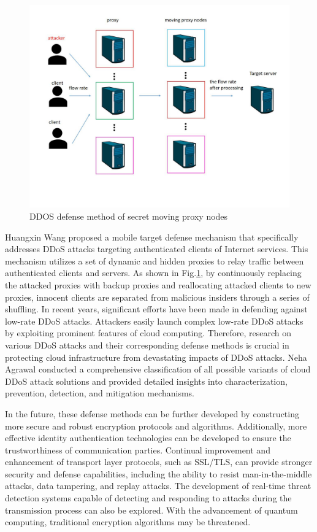 \documentclass[conference]{IEEEtran}
\begin{document}
\begin{figure}[htbp]
    \centerline{\includegraphics[width=0.8\linewidth,height=0.6\linewidth]{picture/de-ddos.jpg}}
    \caption{DDOS defense method of secret moving proxy nodes}
    \label{fig16}
\end{figure}
Huangxin Wang \cite{b131} proposed a mobile target defense mechanism that specifically addresses DDoS
attacks targeting authenticated clients of Internet services.
This mechanism utilizes a set of dynamic and hidden proxies to relay
traffic between authenticated clients and servers. As shown in Fig.\ref{fig16}, by continuously
replacing the attacked proxies with backup proxies and reallocating attacked clients to new proxies,
innocent clients are separated from malicious insiders through a series of shuffling.
In recent years, significant efforts have been made in defending against
low-rate DDoS attacks. Attackers easily launch complex low-rate
DDoS attacks by exploiting prominent features of cloud computing.
Therefore, research on various DDoS attacks and their corresponding defense
methods is crucial in protecting cloud infrastructure from devastating impacts
of DDoS attacks. Neha Agrawal \cite{b132} conducted a comprehensive classification
of all possible variants of cloud DDoS attack solutions and provided detailed insights
into characterization, prevention, detection, and mitigation mechanisms.


In the future, these defense methods can be further developed by constructing more secure and robust encryption protocols and algorithms.
Additionally, more effective identity authentication technologies can be developed to ensure the trustworthiness of communication parties.
Continual improvement and enhancement of transport layer protocols, such as SSL/TLS, can provide stronger security and defense capabilities,
including the ability to resist man-in-the-middle attacks, data tampering, and replay attacks.
The development of real-time threat detection systems capable of detecting and responding to attacks
during the transmission process can also be explored. With the advancement of quantum computing,
traditional encryption algorithms may be threatened.
\end{document}
